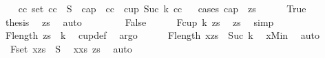 \begin{isabellebody}
\ \ \isamarkupfalse%
\ {\isachardoublequoteopen}{\isasymexists}cc{\isachardot}{\kern0pt}\ set\ cc\ {\isasymsubseteq}\ S\ {\isasymand}\ {\isacharparenleft}{\kern0pt}cap\ {}\ cc\ {\isasymor}\ cup\ {\isacharparenleft}{\kern0pt}Suc\ k{\isacharparenright}{\kern0pt}\ cc{\isacharparenright}{\kern0pt}{\isachardoublequoteclose}\isanewline
\ \ \isamarkupfalse%
{\isacharparenleft}{\kern0pt}cases\ {\isachardoublequoteopen}cap\ {}\ zs{\isachardoublequoteclose}{\isacharparenright}{\kern0pt}\isanewline
\ \ \ \ \isamarkupfalse%
\ True\isanewline
\ \ \ \ \isamarkupfalse%
\ \isamarkupfalse%
\ {\isacharquery}{\kern0pt}thesis\ \isamarkupfalse%
\ zs{\isacharparenleft}{\kern0pt}{}{\isacharcomma}{\kern0pt}{}{\isacharparenright}{\kern0pt}\ \isamarkupfalse%
\ auto\isanewline
\ \ \isamarkupfalse%
\isanewline
\ \ \ \ \isamarkupfalse%
\ False\isanewline
\ \ \ \ \isamarkupfalse%
\ F{}{\isacharcolon}{\kern0pt}{\isachardoublequoteopen}cup\ k\ zs{\isachardoublequoteclose}\ \isamarkupfalse%
\ zs\ \isamarkupfalse%
\ simp\isanewline
\ \ \ \ \isamarkupfalse%
\ F{}{\isacharcolon}{\kern0pt}{\isachardoublequoteopen}length\ zs\ {\isacharequal}{\kern0pt}\ k{\isachardoublequoteclose}\ \isamarkupfalse%
\ cup{\isacharunderscore}{\kern0pt}def\ \isamarkupfalse%
\ argo\isanewline
\ \ \ \ \isamarkupfalse%
\ F{}{\isacharcolon}{\kern0pt}{\isachardoublequoteopen}length\ {\isacharparenleft}{\kern0pt}x{\isacharhash}{\kern0pt}zs{\isacharparenright}{\kern0pt}\ {\isacharequal}{\kern0pt}\ Suc\ k{\isachardoublequoteclose}\ \isamarkupfalse%
\ x{\isacharunderscore}{\kern0pt}Min\ \isamarkupfalse%
\ auto\isanewline
\ \ \ \ \isamarkupfalse%
\ \ F{}{\isacharcolon}{\kern0pt}{\isachardoublequoteopen}set\ {\isacharparenleft}{\kern0pt}x{\isacharhash}{\kern0pt}zs{\isacharparenright}{\kern0pt}\ {\isasymsubseteq}\ S{\isachardoublequoteclose}\ \isamarkupfalse%
\ x{\isacharunderscore}{\kern0pt}xs{\isacharparenleft}{\kern0pt}{}{\isacharparenright}{\kern0pt}\ zs{\isacharparenleft}{\kern0pt}{}{\isacharparenright}{\kern0pt}\ \isamarkupfalse%
\ auto\isanewline
\ \ \ \ \isamarkupfalse%

\end{isabellebody}
